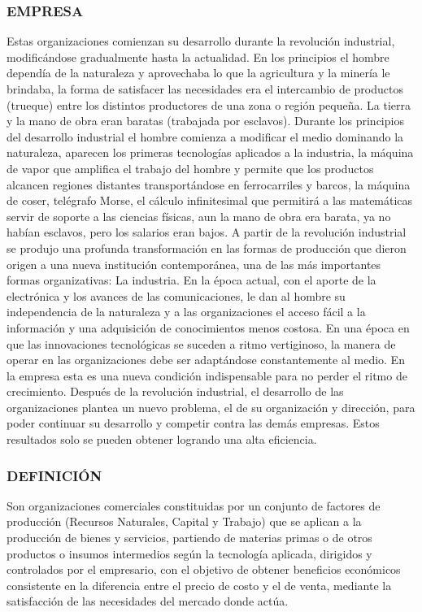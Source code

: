 \subsubsection*{EMPRESA}
Estas organizaciones comienzan su desarrollo durante la revolución industrial, modificándose gradualmente hasta la actualidad. En los principios el hombre dependía de la naturaleza y aprovechaba lo que la agricultura y la minería le brindaba, la forma de satisfacer las necesidades era el intercambio de productos (trueque) entre los distintos productores de una zona o región pequeña. La tierra y la mano de obra eran baratas (trabajada por esclavos). Durante los principios del desarrollo industrial el hombre comienza a modificar el medio dominando la naturaleza, aparecen los primeras tecnologías aplicados a la industria, la máquina de vapor que amplifica el trabajo del hombre y permite que los productos alcancen regiones distantes transportándose en ferrocarriles y barcos, la máquina de coser, telégrafo Morse, el cálculo infinitesimal que permitirá a las matemáticas servir de soporte a las ciencias físicas, aun la mano de obra era barata, ya no habían esclavos, pero los salarios eran bajos. A partir de la revolución industrial se produjo una profunda transformación en las formas de producción que dieron origen a una nueva institución contemporánea, una de las más importantes formas organizativas: La industria. En la época actual, con el aporte de la electrónica y los avances de las comunicaciones, le dan al hombre su independencia de la naturaleza y a las organizaciones el acceso fácil a la información y una adquisición de conocimientos menos costosa. En una época en que las innovaciones tecnológicas se suceden a ritmo vertiginoso, la manera de operar en las organizaciones debe ser adaptándose constantemente al medio. En la empresa esta es una nueva condición indispensable para no perder el ritmo de crecimiento. Después de la revolución industrial, el desarrollo de las organizaciones plantea un nuevo problema, el de su organización y dirección, para poder continuar su desarrollo y competir contra las demás empresas. Estos resultados solo se pueden obtener logrando una alta eficiencia.

\subsubsection*{DEFINICIÓN}
Son organizaciones comerciales constituidas por un conjunto de factores de producción (Recursos Naturales, Capital y Trabajo) que se aplican a la producción de bienes y servicios, partiendo de materias primas o de otros productos o insumos intermedios según la tecnología aplicada, dirigidos y controlados por el empresario, con el objetivo de obtener beneficios económicos consistente en la diferencia entre el precio de costo y el de venta, mediante la satisfacción de las necesidades del mercado donde actúa.

